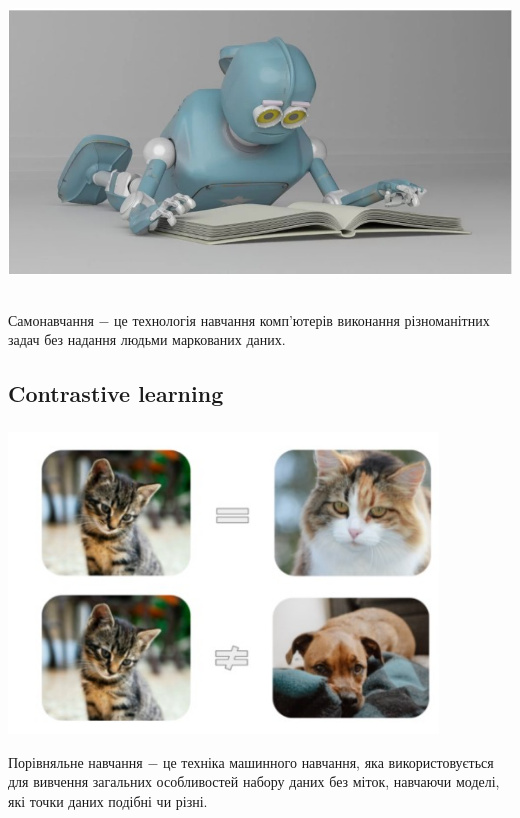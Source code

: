 \documentclass[c]{beamer}
\begin{document}
\begin{frame}
	\frametitle{\insertsection}
	
  	\includegraphics[width=\textwidth, height=8cm, natwidth=850, natheight=450]{self_supervised.jpg}

	Самонавчання $-$ це технологія навчання комп'ютерів виконання різноманітних задач без надання людьми маркованих даних.
\end{frame}

\subsection{Contrastive learning}

\begin{frame}
	\frametitle{\insertsection}
	
  	\includegraphics[width=\textwidth, height=8cm, natwidth=497, natheight=349]{contrastive.jpg}

	Порівняльне навчання $-$ це техніка машинного навчання, яка використовується для вивчення загальних особливостей набору даних без міток, навчаючи моделі, які точки даних подібні чи різні.
\end{frame}
\end{document}
